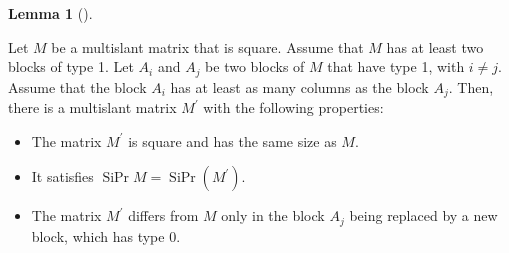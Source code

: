 \documentclass[numbers=enddot,12pt,final,onecolumn,notitlepage]{scrartcl}%
\theoremstyle{definition}
\newtheorem{lem}[theo]{Lemma}
\newenvironment{lemma}[1][]
{\begin{lem}[#1]\begin{leftbar}}
{\end{leftbar}\end{lem}}
\theoremstyle{plainsl}
\begin{document}
\begin{lemma}
\label{lem.multislant.red11}Let $M$ be a multislant matrix that is square.
Assume that $M$ has at least two blocks of type 1. Let $A_{i}$ and $A_{j}$ be
two blocks of $M$ that have type 1, with $i\neq j$. Assume that the block
$A_{i}$ has at least as many columns as the block $A_{j}$. Then, there is a
multislant matrix $M^{\prime}$ with the following properties:

\begin{itemize}
\item The matrix $M^{\prime}$ is square and has the same size as $M$.

\item It satisfies $\operatorname*{SiPr}M=\operatorname*{SiPr}\left(
M^{\prime}\right)  $.

\item The matrix $M^{\prime}$ differs from $M$ only in the block $A_{j}$ being
replaced by a new block, which has type 0.
\end{itemize}
\end{lemma}
\end{document}
